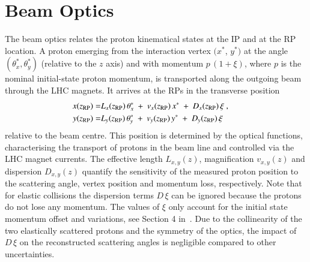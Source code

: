\section{Beam Optics}
\label{sec:beam optics}
%
The beam optics relates the proton kinematical states at the IP and at the RP location. A proton emerging from the interaction vertex $(x^*$, $y^*)$ at the angle $(\theta_x^*,\theta_y^*)$ (relative to the $z$ axis) and with momentum $p\,(1+\xi)$, where $p$ is the nominal initial-state proton momentum, is transported along the outgoing beam through the LHC magnets. It arrives at the RPs in the transverse position
\begin{equation}
\label{eq:prot trans}
	\begin{aligned}
		x(z_{\rm RP}) =& L_x(z_{\rm RP})\, \theta_x^*\ +\ v_x(z_{\rm RP})\, x^*\ +\ D_x(z_{\rm RP})\, \xi\ ,\cr
		y(z_{\rm RP}) =& L_y(z_{\rm RP})\, \theta_y^*\ +\ v_y(z_{\rm RP})\, y^*\ +\ D_y(z_{\rm RP})\, \xi \quad
	\end{aligned}
\end{equation}
relative to the beam centre. This position is determined by the optical functions, characterising the transport of protons in the beam line and controlled via 
the LHC magnet currents.
The effective length $L_{x,y}(z)$, magnification $v_{x,y}(z)$ and dispersion $D_{x,y}(z)$ quantify the sensitivity of the measured proton position to the 
scattering angle, vertex position and momentum loss, respectively.
Note that for elastic collisions the dispersion terms $D\,\xi$ can be ignored because the protons do not lose any momentum. The values of $\xi$ only account for the initial state momentum offset and variations, see Section 4 in~\cite{8tev-90m}. Due to the collinearity of the two elastically scattered protons and the symmetry of the optics, the impact of $D\,\xi$ on the reconstructed scattering angles is negligible compared to other uncertainties.

